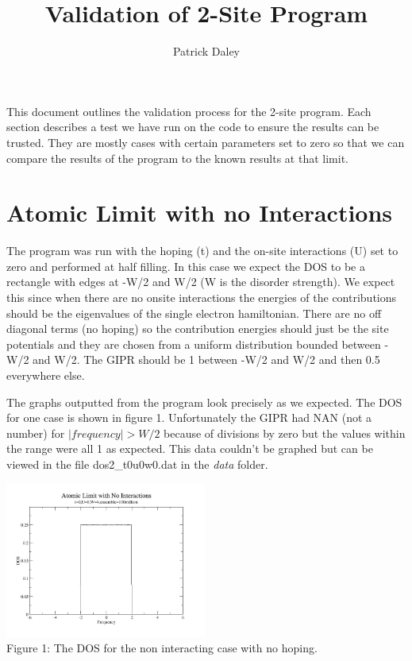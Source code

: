 \documentclass{article}
\author{Patrick Daley}
\title{Validation of 2-Site Program}
\begin{document}
\maketitle

This document outlines the validation process for the 2-site program. Each section describes a test we have run on the code to ensure the results can be trusted. They are mostly cases with certain parameters set to zero so that we can compare the results of the program to the known results at that limit. 

\section{Atomic Limit with no Interactions}
The program was run with the hoping (t) and the on-site interactions (U) set to zero and performed at half filling. In this case we expect the DOS to be a rectangle with edges at -W/2 and W/2 (W is the disorder strength). We expect this since when there are no onsite interactions the energies of the contributions should be the eigenvalues of the single electron hamiltonian. There are no off diagonal terms (no hoping) so the contribution energies should just be the site potentials and they are chosen from a uniform distribution bounded between -W/2 and W/2. The GIPR should be 1 between -W/2 and W/2 and then 0.5 everywhere else.

The graphs outputted from the program look precisely as we expected.  The DOS for one case is shown in figure 1. Unfortunately the GIPR had NAN (not a number) for $ | frequency | > W/2 $ because of divisions by zero but the values within the range were all 1 as expected. This data couldn't be graphed but can be viewed in the file dos2\_t0u0w0.dat in the \textit{data} folder.

\begin{center}
	\includegraphics[width=250px]{dos2_t0u0w4.jpg} \\
	Figure 1: The DOS for the non interacting case with no hoping.
\end{center}
\end{document}
